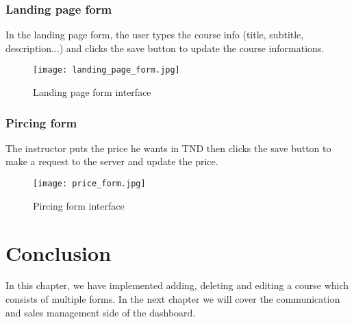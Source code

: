 \subsubsection{Landing page form}
In the landing page form, the user types the course info (title, subtitle, description...) and clicks the save button to update the course informations.

\vfill
\clearpage

\begin{figure}[!ht]
    \centering
    \texttt{[image: landing\_page\_form.jpg]}
    \caption{Landing page form interface}
    \label{fig:landing_page_form}
\end{figure}


\subsubsection{Pircing form}
The instructor puts the price he wants in TND then clicks the save button to make a request to the server and update the price.

\begin{figure}[!ht]
    \centering
    \texttt{[image: price\_form.jpg]}
    \caption{Pircing form interface}
    \label{fig:price_form}
\end{figure}

\vfill
\clearpage

\section*{Conclusion}
In this chapter, we have implemented adding, deleting and editing a course which consists of multiple forms. In the next chapter we will cover the communication and sales management side of the dashboard.